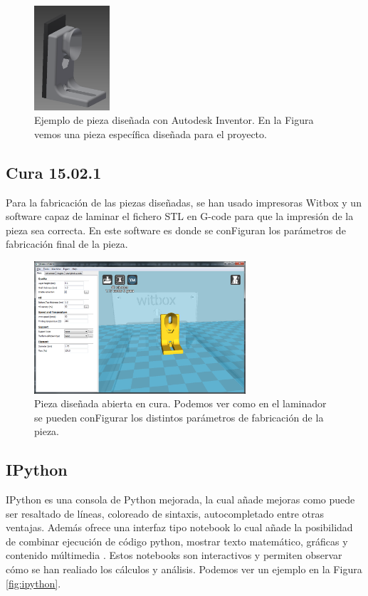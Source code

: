 \begin{figure}[H]
    \centering
    \includegraphics[width=0.25\textwidth]{images/peletizadora/guia.png}
    \caption[Ejemplo de pieza diseñada con Autodesk Inventor.]{Ejemplo de pieza diseñada con Autodesk Inventor. En la Figura vemos una pieza específica diseñada para el proyecto.}
    \label{fig:pieza}
\end{figure}

\subsection{Cura 15.02.1}
Para la fabricación de las piezas diseñadas, se han usado impresoras Witbox y un software capaz de laminar el fichero STL en G-code para que la impresión de la pieza sea correcta. En este software es donde se conFiguran los parámetros de fabricación final de la pieza.

\begin{figure}[H]
    \centering
    \includegraphics[width=0.7\textwidth]{images/cura.png}
    \caption[Pieza diseñada abierta en cura.]{Pieza diseñada abierta en cura. Podemos ver como en el laminador se pueden conFigurar los distintos parámetros de fabricación de la pieza.}
    \label{fig:cura}
\end{figure}

\subsection{IPython}
IPython \cite{PER-GRA:2007} es una consola de Python mejorada, la cual añade mejoras como puede ser resaltado de líneas, coloreado de sintaxis, autocompletado entre otras ventajas. Además ofrece una interfaz tipo notebook lo cual añade la posibilidad de combinar ejecución de código python, mostrar texto matemático, gráficas y contenido múltimedia \cite{ipython}. Estos notebooks son interactivos y permiten observar cómo se han realiado los cálculos y análisis. Podemos ver un ejemplo en la Figura \ref{fig:ipython}.

